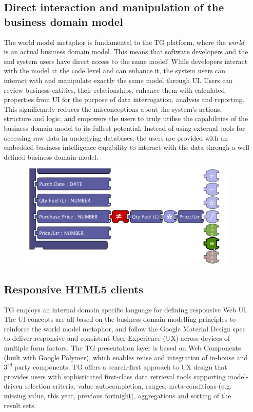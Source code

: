 \documentclass[a4paper,12pt,oneside,openright,final]{memoir} %
\begin{document}
\subsection*{Direct interaction and manipulation of the business domain model}
	The world model metaphor is fundamental to the TG platform, where the \emph{world} is an actual business domain model.
	This means that software developers and the end system users have direct access to the same model!
	While developers interact with the model at the code level and can enhance it, the system users can interact with and manipulate exactly the same model through UI.
	Users can review business entities, their relationships, enhance them with calculated properties from UI for the purpose of data interrogation, analysis and reporting.
	This significantly reduces the misconceptions about the system's actions, structure and logic, and empowers the users to truly utilise the capabilities of the business domain model to its fullest potential.
	Instead of using external tools for accessing raw data in underlying databases, the users are provided with an embedded business intelligence capability to interact with the data through a well defined business domain model.
	\begin{figure}[!h]
  		\centering
  		\includegraphics[scale=0.20]{images/01-rulesarea-suggestionmenu.png}  
		\vspace{-30pt} 
  	\end{figure}

	\BgThispage
\subsection*{Responsive HTML5 clients}
	TG employs an internal domain specific language for defining responsive Web UI.
	The UI concepts are all based on the business domain modelling principles to reinforce the world model metaphor, and follow the Google Material Design spec to deliver responsive and consistent User Experience (UX) across devices of multiple form factors.
	The TG presentation layer is based on Web Components (built with Google Polymer), which enables reuse and integration of in-house and $3^{rd}$ party components.
	TG offers a search-first approach to UX design that provides users with sophisticated first-class data retrieval tools supporting model-driven selection criteria, value autocompletion, ranges, meta-conditions (e.g. missing value, this year, previous fortnight), aggregations and sorting of the result sets. 
\end{document}
